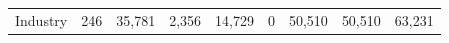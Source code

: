 \begin{frame}
\begin{table}[htbp]
\begin{tabular}{l | rrrrrrrr}
Industry & 246   & 35,781 & 2,356 & 14,729 & 0     & 50,510 & 50,510 & 63,231 \\
    \end{tabular}%
  \label{mnmerger}%
\end{table}

\end{frame}

